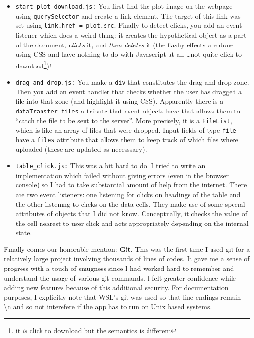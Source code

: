 \documentclass[11pt]{scrartcl}
\begin{document}
\begin{itemize}
  \item \texttt{start\_plot\_download.js:} You first find the plot image on the
    webpage using \texttt{querySelector} and create a link element. The target
    of this link was set using \texttt{link.href = plot.src}. Finally to detect
    clicks, you add an event listener which does a weird thing: it creates the
    hypothetical object as a part of the document, \emph{clicks} it, and
    \emph{then deletes} it (the flashy effects are done using CSS and have
    nothing to do with Javascript at all \dots not quite click to
    download\footnote{it \emph{is} click to download but the semantics is
    different})!
  \item \texttt{drag\_and\_drop.js:} You make a \texttt{div} that constitutes
    the drag-and-drop zone. Then you add an event handler that checks whether
    the user has dragged a file into that zone (and highlight it using CSS).
    Apparently there is a \texttt{dataTransfer.files} attribute that event
    objects have that allows them to ``catch the file to be sent to the
    server''. More precisely, it is a \texttt{FileList}, which is like an
    array of files that were dropped. Input fields of type \texttt{file} have a
    \texttt{files} attribute that allows them to keep track of which files where
    uploaded (these are updated as necesssary).
  \item \texttt{table\_click.js:} This was a bit hard to do. I tried to write an
    implementation which failed without giving errors (even in the browser
    console) so I had to take substantial amount of help from the internet.
    There are two event listeners: one listening for clicks on headings of the
    table and the other listening to clicks on the data cells. They make use of
    some special attributes of objects that I did not know. Conceptually, it
    checks the value of the cell nearest to user click and acts appropriately
    depending on the internal state.

\end{itemize}

Finally comes our honorable mention: \textbf{Git}. This was the first time I used
git for a relatively large project involving thousands of lines of codes. It
gave me a sense of progress with a touch of smugness since I had worked hard to
remember and understand the usage of various git commands. I felt greater
confidence while adding new features because of this additional security. For
documentation purposes, I explicitly note that WSL's git was used so that line
endings remain \textbackslash\texttt{n} and so not interefere if the app has to
run on Unix based systems.
\end{document}

